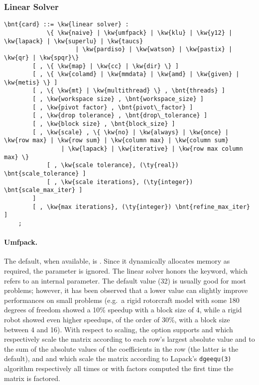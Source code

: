 \subsubsection{Linear Solver}   
\label{sec:LINEAR-SOLVER}
\begin{Verbatim}[commandchars=\\\{\}]
    \bnt{card} ::= \kw{linear solver} :
            \{ \kw{naive} | \kw{umfpack} | \kw{klu} | \kw{y12} | \kw{lapack} | \kw{superlu} | \kw{taucs} 
                    | \kw{pardiso} | \kw{watson} | \kw{pastix} | \kw{qr} | \kw{spqr}\}
        [ , \{ \kw{map} | \kw{cc} | \kw{dir} \} ]
        [ , \{ \kw{colamd} | \kw{mmdata} | \kw{amd} | \kw{given} | \kw{metis} \} ]
        [ , \{ \kw{mt} | \kw{multithread} \} , \bnt{threads} ]
        [ , \kw{workspace size} , \bnt{workspace_size} ] 
        [ , \kw{pivot factor} , \bnt{pivot\_factor} ]
        [ , \kw{drop tolerance} , \bnt{drop\_tolerance} ]
        [ , \kw{block size} , \bnt{block_size} ]
        [ , \kw{scale} , \{ \kw{no} | \kw{always} | \kw{once} | \kw{row max} | \kw{row sum} | \kw{column max} | \kw{column sum}
                | \kw{lapack} | \kw{iterative} | \kw{row max column max} \}
            [ , \kw{scale tolerance}, (\ty{real}) \bnt{scale_tolerance} ]
            [ , \kw{scale iterations}, (\ty{integer}) \bnt{scale_max_iter} ]
        ]
        [ , \kw{max iterations}, (\ty{integer}) \bnt{refine_max_iter} ]
    ;
\end{Verbatim}

\paragraph{Umfpack.}
The default, when available, is .
Since it dynamically allocates memory as required, the  
parameter is ignored.
The  linear solver honors the  keyword,
which refers to an internal parameter.
The default value (32) is usually good for most problems; however,
it has been observed that a lower value can slightly improve
performances on small problems (e.g.\ a rigid rotorcraft model
with some 180 degrees of freedom showed a 10\% speedup with 
a block size of 4, while a rigid robot showed even higher speedups,
of the order of 30\%, with a block size between 4 and 16).
With respect to scaling, the  option supports  and 
which respectively scale the matrix according to each row's
largest absolute value and to the sum of the absolute values
of the coefficients in the row (the latter is the default),
and  and  which scale the matrix
according to Lapack's \texttt{dgeequ(3)} algorithm
respectively all times or with factors computed the first time
the matrix is factored.

